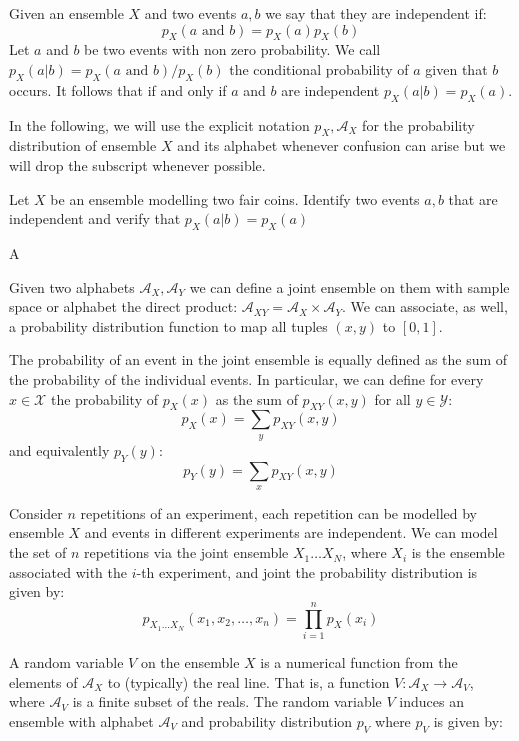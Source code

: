 Given an ensemble $X$ and two events $a,b$ we say that they are independent if:
\begin{equation}
p_{X}(a \text{ and } b)=p_{X}(a)p_{X}(b)
\end{equation}
Let $a$ and $b$ be two events with non zero probability. We call $p_{X}(a|b)=p_{X}(a \text{ and } b)/p_{X}(b)$ the conditional probability of $a$ given that $b$ occurs. It follows that if and only if $a$ and $b$ are independent $p_{X}(a|b)=p_{X}(a)$.

In the following, we will use the explicit notation $p_{X},\mathcal A_{X}$ for the probability distribution of ensemble $X$ and its alphabet whenever confusion can arise but we will drop the subscript whenever possible.
\begin{exercise}
Let $X$ be an ensemble modelling two fair coins. Identify two events $a,b$ that are independent and verify that $p_{X}(a|b)=p_{X}(a)$
\end{exercise}
\begin{solution}
A
\end{solution}
Given two alphabets $\mathcal A_{X},\mathcal A_Y$ we can define a joint ensemble on them with sample space or alphabet the direct product: $\mathcal A_{XY} = \mathcal A_X \times \mathcal A_Y$. 
We can associate, as well, a probability distribution function to map all tuples $(x,y)$ to $[0,1]$. 

The probability of an event in the joint ensemble is equally defined as the sum of the probability of the individual events. 
In particular, we can define for every $x\in\mathcal X$ the probability of $p_X(x)$ as the sum of $p_{XY}(x,y)$ for all $y\in\mathcal Y$:
\begin{equation}
p_X(x)=\sum_{y}p_{XY}(x,y)
\end{equation} 
\noindent and equivalently $p_Y(y)$:
\begin{equation}
p_Y(y)=\sum_{x}p_{XY}(x,y)
\end{equation} 
\begin{example}
Consider $n$ repetitions of an experiment, each repetition can be modelled by ensemble $X$ and events in different experiments are independent. We can model the set of $n$ repetitions via the joint ensemble $X_1\ldots X_N$, where $X_i$ is the ensemble associated with the $i$-th experiment, and joint the probability distribution is given by:
\begin{equation}
p_{X_1\ldots X_N}(x_1,x_2,\ldots,x_n)=\prod_{i=1}^np_X(x_i)
\end{equation}
\end{example}
A random variable $V$ on the ensemble $X$ is a numerical function from the elements of $\mathcal A_X$ to (typically) the real line. That is, a function $V:\mathcal{A}_X\rightarrow \mathcal A_V$, where $\mathcal A_V$ is a finite subset of the reals. The random variable $V$ induces an ensemble with alphabet $\mathcal A_V$ and probability distribution $p_V$ where $p_V$ is given by:

